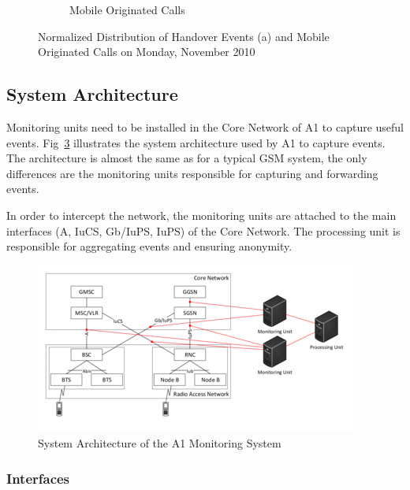 \documentclass[master,english]{hgbthesis}
\begin{document}
\begin{figure}
\begin{subfigure}[b]{0.5\textwidth}
		\caption{Mobile Originated Calls}

		\label{fig:distmoc}

	\end{subfigure}

	\caption{Normalized Distribution of Handover Events (a) and Mobile Originated Calls on Monday,  November 2010}\label{fig:distevents}

\end{figure}

\subsection{System Architecture}

Monitoring units need to be installed in the Core Network of A1 to capture useful events. Fig~\ref{fig:A1Network} illustrates the system architecture used by A1 to capture events. The architecture is almost the same as for a typical GSM system, the only differences are the monitoring units responsible for capturing and forwarding events.

In order to intercept the network, the monitoring units are attached to the main interfaces (A, IuCS, Gb/IuPS, IuPS) of the Core Network. The processing unit is responsible for aggregating events and ensuring anonymity.

\begin{figure}

	\centering

	\includegraphics[width=\linewidth]{./images/A1Network.png}

	\caption{System Architecture of the A1 Monitoring System}

	\label{fig:A1Network}

\end{figure}

\subsubsection{Interfaces}
\end{document}
